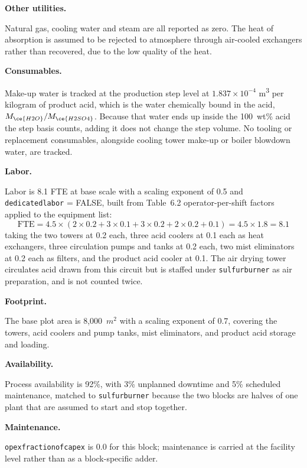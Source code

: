 \documentclass{article}
\renewcommand\_{\textunderscore\allowbreak}
\begin{document}
\medskip
\noindent\textbf{Other utilities.}\quad

Natural gas, cooling water and steam are all reported as zero. The heat of absorption is assumed to be rejected to atmosphere through air-cooled exchangers rather than recovered, due to the low quality of the heat. 

\medskip
\noindent\textbf{Consumables.}\quad
 
Make-up water is tracked at the production step level at $1.837\times10^{-4}$ \si{m^3} per kilogram of product acid, which is the water chemically bound in the acid, $M_{\ce{H2O}}/M_{\ce{H2SO4}}$. Because that water ends up inside the 100~wt\% acid the step basis counts, adding it does not change the step volume. No tooling or replacement consumables, alongside cooling tower make-up or boiler blowdown water, are tracked.

\medskip
\noindent\textbf{Labor.}\quad
 
Labor is 8.1 FTE at base scale with a scaling exponent of 0.5 and \texttt{dedicated\_labor} = FALSE, built from \citet{ulrichChemicalEngineeringProcess2004} Table~6.2 operator-per-shift factors applied to the equipment list:
\[
    \text{FTE} = 4.5 \times (2 \times 0.2 + 3 \times 0.1 + 3 \times 0.2 + 2 \times 0.2 + 0.1) = 4.5 \times 1.8 = 8.1
\]
taking the two towers at 0.2 each, three acid coolers at 0.1 each as heat exchangers, three circulation pumps and tanks at 0.2 each, two mist eliminators at 0.2 each as filters, and the product acid cooler at 0.1. The air drying tower circulates acid drawn from this circuit but is staffed under \texttt{sulfur\_burner} as air preparation, and is not counted twice.

\medskip
\noindent\textbf{Footprint.}\quad
 
The base plot area is 8,000~$\si{m^2}$ with a scaling exponent of 0.7, covering the towers, acid coolers and pump tanks, mist eliminators, and product acid storage and loading.
 
\medskip
\noindent\textbf{Availability.}\quad
 
Process availability is 92\%, with 3\% unplanned downtime and 5\% scheduled maintenance, matched to \texttt{sulfur\_burner} because the two blocks are halves of one plant that are assumed to start and stop together. 
 
\medskip
\noindent\textbf{Maintenance.}\quad
 
\texttt{opex\_fraction\_of\_capex} is 0.0 for this block; maintenance is carried at the facility level rather than as a block-specific adder.
\end{document}
